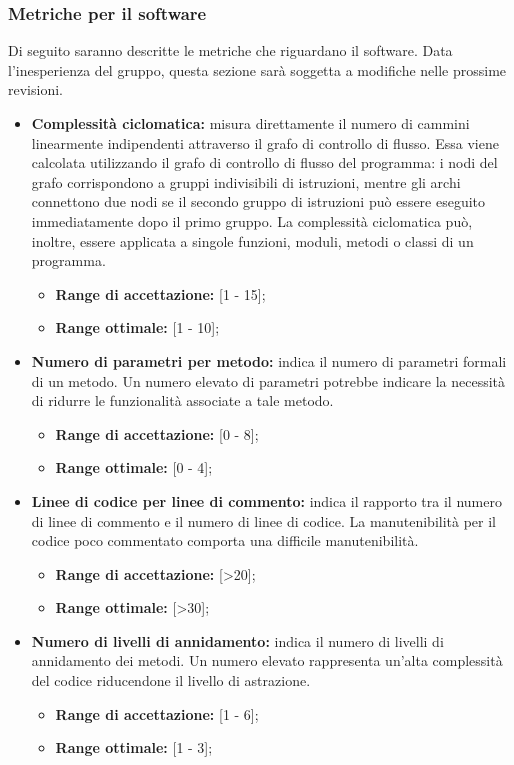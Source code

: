 	\subsubsection{Metriche per il software}
	Di seguito saranno descritte le metriche che riguardano il software. Data l'inesperienza del gruppo, questa sezione sarà soggetta a modifiche nelle prossime revisioni.
	\begin{itemize}
		\item \textbf{Complessità ciclomatica:} misura direttamente il numero di cammini linearmente indipendenti attraverso il grafo di controllo di flusso. Essa viene calcolata utilizzando il grafo di controllo di flusso del programma: i nodi del grafo corrispondono a gruppi indivisibili di istruzioni, mentre gli archi connettono due nodi se il secondo gruppo di istruzioni può essere eseguito immediatamente dopo il primo gruppo. La complessità ciclomatica può, inoltre, essere applicata a singole funzioni, moduli, metodi o classi di un programma.
			\begin{itemize}
				\item \textbf{Range di accettazione:} [1 - 15];
				\item \textbf{Range ottimale:} [1 - 10];
			\end{itemize}
		\item \textbf{Numero di parametri per metodo:} indica il numero di parametri formali di un metodo. Un numero elevato di parametri potrebbe indicare la necessità di ridurre le funzionalità associate a tale metodo.
			\begin{itemize}
				\item \textbf{Range di accettazione:} [0 - 8];
				\item \textbf{Range ottimale:} [0 - 4];
			\end{itemize}
		\item \textbf{Linee di codice per linee di commento:} indica il rapporto tra il numero di linee di commento e il numero di linee di codice. La manutenibilità per il codice poco commentato comporta una difficile manutenibilità.
			\begin{itemize}
				\item \textbf{Range di accettazione:} [>20];
				\item \textbf{Range ottimale:} [>30];
			\end{itemize}
		\item \textbf{Numero di livelli di annidamento:} indica il numero di livelli di annidamento dei metodi. Un numero elevato rappresenta un'alta complessità del codice riducendone il livello di astrazione.
			\begin{itemize}
				\item \textbf{Range di accettazione:} [1 - 6];
				\item \textbf{Range ottimale:} [1 - 3];
			\end{itemize}
	\end{itemize}